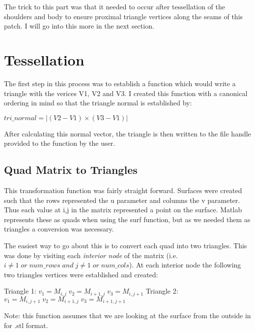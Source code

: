 \documentclass[twocolumn]{article}
\begin{document}
The trick to this part was that it needed to occur after tessellation of the shoulders and body to ensure proximal triangle vertices along the seams of this patch. I will go into this more in the next section. 

\section{Tessellation}

The first step in this process was to establish a function which would write a triangle with the verices V1, V2 and V3. I created this function with a canonical ordering in mind so that the triangle normal is established by:

\begin{center}
$ tri\_normal = |(V2-V1) \times (V3-V1)|$
\end{center} 

After calculating this normal vector, the triangle is then written to the file handle provided to the function by the user. 

\subsection{Quad Matrix to Triangles}

This transformation function was fairly straight forward. Surfaces were created such that the rows represented the u parameter and columns the v parameter. Thus each value at i,j in the matrix represented a point on the surface. Matlab represents these as quads when using the surf function, but as we needed them as triangles a conversion was necessary. 

The easiest way to go about this is to convert each quad into two triangles. This was done by visiting each \textit{interior node} of the matrix (i.e. $ i \neq  1 \; or \; num\_rows \; and \; j \neq 1 \; or \; num\_cols $). At each interior node the following two triangles vertices were established and created:

\vspace{2mm}
\begin{flushleft}
Triangle 1:
$v_1 = M_{i,j} \; v_2= M_{i+1,j} \; v_3 = M_{i,j+1} $
Triangle 2:
$v_1 = M_{i,j+1} \; v_2= M_{i+1,j} \; v_3 = M_{i+1,j+1} $
\end{flushleft}
\vspace{2mm}

Note: this function assumes that we are looking at the surface from the outside in for .stl format.
\end{document}
